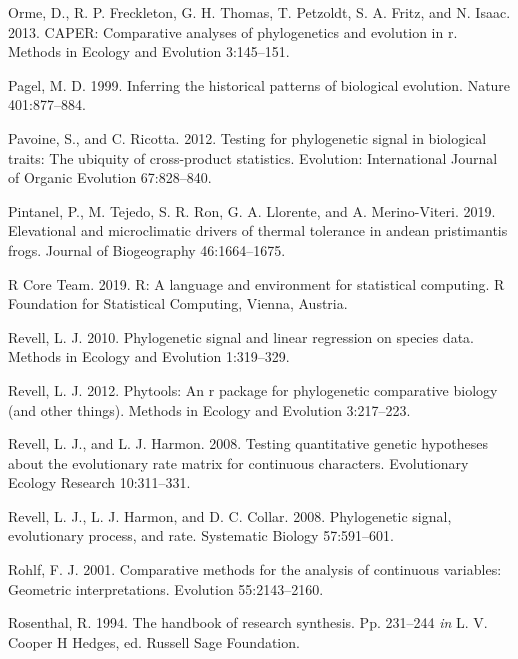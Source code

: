 \documentclass[
]{article}
\begin{document}
\leavevmode\hypertarget{ref-Orme2013}{}%
Orme, D., R. P. Freckleton, G. H. Thomas, T. Petzoldt, S. A. Fritz, and
N. Isaac. 2013. CAPER: Comparative analyses of phylogenetics and
evolution in r. Methods in Ecology and Evolution 3:145--151.

\leavevmode\hypertarget{ref-Pagel1999}{}%
Pagel, M. D. 1999. Inferring the historical patterns of biological
evolution. Nature 401:877--884.

\leavevmode\hypertarget{ref-Pavoine2012}{}%
Pavoine, S., and C. Ricotta. 2012. Testing for phylogenetic signal in
biological traits: The ubiquity of cross-product statistics. Evolution:
International Journal of Organic Evolution 67:828--840.

\leavevmode\hypertarget{ref-Pintanel2019}{}%
Pintanel, P., M. Tejedo, S. R. Ron, G. A. Llorente, and A.
Merino-Viteri. 2019. Elevational and microclimatic drivers of thermal
tolerance in andean pristimantis frogs. Journal of Biogeography
46:1664--1675.

\leavevmode\hypertarget{ref-RCT}{}%
R Core Team. 2019. R: A language and environment for statistical
computing. R Foundation for Statistical Computing, Vienna, Austria.

\leavevmode\hypertarget{ref-Revell2010}{}%
Revell, L. J. 2010. Phylogenetic signal and linear regression on species
data. Methods in Ecology and Evolution 1:319--329.

\leavevmode\hypertarget{ref-Revell2012}{}%
Revell, L. J. 2012. Phytools: An r package for phylogenetic comparative
biology (and other things). Methods in Ecology and Evolution 3:217--223.

\leavevmode\hypertarget{ref-RevellHarmon2008}{}%
Revell, L. J., and L. J. Harmon. 2008. Testing quantitative genetic
hypotheses about the evolutionary rate matrix for continuous characters.
Evolutionary Ecology Research 10:311--331.

\leavevmode\hypertarget{ref-Revell_et_al2008}{}%
Revell, L. J., L. J. Harmon, and D. C. Collar. 2008. Phylogenetic
signal, evolutionary process, and rate. Systematic Biology 57:591--601.

\leavevmode\hypertarget{ref-Rohlf2001}{}%
Rohlf, F. J. 2001. Comparative methods for the analysis of continuous
variables: Geometric interpretations. Evolution 55:2143--2160.

\leavevmode\hypertarget{ref-Rosenthal1994}{}%
Rosenthal, R. 1994. The handbook of research synthesis. Pp. 231--244
\emph{in} L. V. Cooper H Hedges, ed. Russell Sage Foundation.
\end{document}
